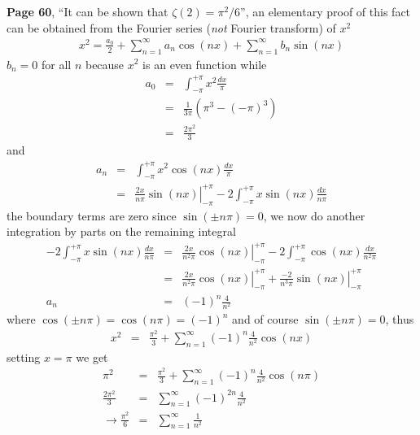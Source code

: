 \documentclass[aps,preprint,preprintnumbers,nofootinbib,showpacs,prd]{revtex4-1}
\newcommand{\nbea}{\begin{eqnarray*}}
\newcommand{\neea}{\end{eqnarray*}}
\begin{document}
{\bf Page 60}, ``It can be shown that $\zeta(2) = \pi^2/6$'', an elementary proof of this fact can be obtained from the Fourier series ({\it not} Fourier transform) of $x^2$
%
\nbea
x^2 = \frac{a_0}{2} + \sum_{n=1}^\infty a_n\cos(nx) + \sum_{n=1}^\infty b_n\sin(nx)
\neea
%
$b_n = 0$ for all $n$ because $x^2$ is an even function while
%
\nbea
a_0 & = & \int_{-\pi}^{+\pi} x^2 \frac{dx}{\pi} \\
& = & \frac{1}{3\pi} \left (\pi^3 - (-\pi)^3 \right ) \\
& = & \frac{2\pi^2}{3}
\neea
%
and
%
\nbea
a_n & = & \int_{-\pi}^{+\pi} x^2 \cos(nx) \frac{dx}{\pi} \\
& = & \left.\frac{2x}{n\pi}\sin(nx)\right|_{-\pi}^{+\pi} - 2\int_{-\pi}^{+\pi} x \sin(nx) \frac{dx}{n\pi}
\neea
%
the boundary terms are zero since $\sin(\pm n\pi) = 0$, we now do another integration by parts on the remaining integral
%
\nbea
- 2\int_{-\pi}^{+\pi} x \sin(nx) \frac{dx}{n\pi} & = & \left.\frac{2x}{n^2\pi}\cos(nx)\right|_{-\pi}^{+\pi} - 2\int_{-\pi}^{+\pi}  \cos(nx) \frac{dx}{n^2\pi} \\
& = & \left.\frac{2x}{n^2\pi}\cos(nx)\right|_{-\pi}^{+\pi}  + \left.\frac{-2}{n^3\pi}\sin(nx)\right|_{-\pi}^{+\pi} \\
a_n & = & (-1)^n\frac{4}{n^2}
\neea
%
where $\cos(\pm n\pi) = \cos(n\pi) = (-1)^n$ and of course $\sin(\pm n\pi) = 0$, thus
%
\nbea
x^2 & = & \frac{\pi^2}{3} + \sum_{n=1}^\infty (-1)^n\frac{4}{n^2} \cos(nx)
\neea
%
setting $x=\pi$ we get
%
\nbea
\pi^2 & = & \frac{\pi^2}{3} + \sum_{n=1}^\infty (-1)^n\frac{4}{n^2} \cos(n\pi) \\
\frac{2\pi^2}{3} & = & \sum_{n=1}^\infty (-1)^{2n}\frac{4}{n^2} \\
\to \frac{\pi^2}{6} & = & \sum_{n=1}^\infty \frac{1}{n^2}
\neea
%
\end{document}
